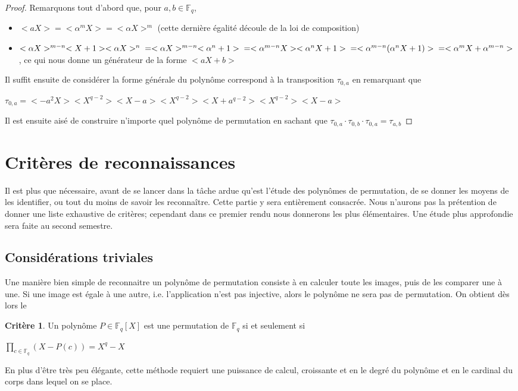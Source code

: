 \documentclass[12pt]{article}
\newcommand{\Fq}{\mathds{F}_q}
\theoremstyle{definition}
\newtheorem{crit}{Critère}
\begin{document}
\begin{proof}
Remarquons tout d'abord que, pour $a, b \in \Fq$, 
	\begin{itemize}
		\item $<aX> = <\alpha^mX> = <\alpha X>^m$ (cette dernière égalité découle de la loi de composition)
		\item $<\alpha X>^{m-n}<X+1><\alpha X>^n  \newline
		= <\alpha X>^{m-n}<\alpha^n + 1> \newline
		= <\alpha^{m-n} X ><\alpha^n X+ 1> \newline
		= <\alpha^{m-n}(\alpha^n X+ 1)> \newline
		= <\alpha^mX+\alpha^{m-n}>$ , ce qui nous donne un générateur de la forme $<aX + b>$
	\end{itemize}
Il suffit ensuite de considérer la forme générale du polynôme correspond à la transposition $\tau_{0,a}$ en remarquant que 
\begin{center} $\tau_{0,a} = <-a^2X><X^{q-2}><X-a><X^{q-2}><X+a^{q-2}><X^{q-2}><X-a>$ \end{center}
Il est ensuite aisé de construire n'importe quel polynôme de permutation en sachant que $\tau_{0,a} \cdot \tau_{0,b} \cdot \tau_{0,a} = \tau_{a,b}$
\end{proof}


\pagebreak


\section{Critères de reconnaissances}
Il est plus que nécessaire, avant de se lancer dans la tâche ardue qu'est l'étude des polynômes de permutation, de se donner les moyens de les identifier, ou tout du moins de savoir les reconnaître. Cette partie y sera entièrement consacrée. Nous n'aurons pas la prétention de donner une liste exhaustive de critères; cependant dans ce premier rendu nous donnerons les plus élémentaires. Une étude plus approfondie sera faite au second semestre.

\subsection{Considérations triviales}
Une manière bien simple de reconnaitre un polynôme de permutation consiste à en calculer toute les images, puis de les comparer une à une. Si une image est égale à une autre, i.e. l'application n'est pas injective, alors le polynôme ne sera pas de permutation. On obtient dès lors le 
\begin{crit}
Un polynôme $P \in \Fq[X]$ est une permutation de $\Fq$ si et seulement si \begin{center}$\displaystyle\prod_{c \in \Fq}(X-P(c)) = X^q -X$ \end{center}
\end{crit}
En plus d'être très peu élégante, cette méthode requiert une puissance de calcul, croissante et en le degré du polynôme et en le cardinal du corps dans lequel on se place. 
\end{document}
